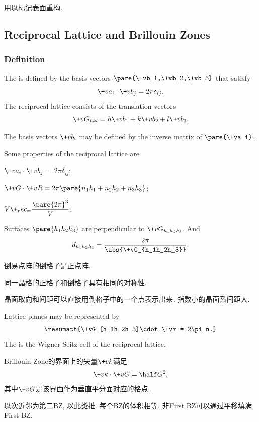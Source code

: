 \documentclass[hidelinks]{ctexart}
\begin{document}
用以标记表面重构.




\subsection{Reciprocal Lattice and Brillouin Zones} %
\label{sub:reciprocal_lattice_and_brillouin_zones}

\subsubsection{Definition} %
\label{ssub:definition}

The  is defined by the basis vectors $\pare{\+vb_1,\+vb_2,\+vb_3}$ that satisfy
\[ \+va_i \cdot \+vb_j = 2\pi \delta_{ij}. \]
The reciprocal lattice consists of the translation vectors
\[ \+vG_{hkl} = h\+vb_1 + k\+vb_2 + l\+vb_3. \]
\begin{remark}
    The basis vectors $\+vb_i$ may be defined by the inverse matrix of $\pare{\+va_i}$.
\end{remark}
Some properties of the reciprocal lattice are
\begin{cenum}
    \item $\+va_i \cdot \+vb_j$ = $2\pi \delta_{ij}$;
    \item $\+vG \cdot \+vR = 2\pi \pare{n_1h_1 + n_2h_2 + n_3 h_3}$;
    \item $\displaystyle V\+_rec_ = \frac{\pare{2\pi}^3}{V}$;
    \item Surfaces $\pare{h_1h_2h_3}$ are perpendicular to $\+vG_{h_1h_2h_3}$. And
    \[ d_{h_1h_2h_3} = \frac{2\pi}{\abs{\+vG_{h_1h_2h_3}}}. \]
    \item 倒易点阵的倒格子是正点阵.
    \item 同一晶格的正格子和倒格子具有相同的对称性.
\end{cenum}
晶面取向和间距可以直接用倒格子中的一个点表示出来. 指数小的晶面系间距大.
\par
Lattice planes may be represented by
\[ \resumath{\+vG_{h_1h_2h_3}\cdot \+vr = 2\pi n.} \]
The  is the Wigner-Seitz cell of the reciprocal lattice.\par
Brillouin Zone的界面上的矢量$\+vk$满足
\[ \+vk\cdot \+vG = \half G^2, \]
其中$\+vG$是该界面作为垂直平分面对应的格点.
\begin{remark}
    以次近邻为第二BZ, 以此类推. 每个BZ的体积相等. 非First BZ可以通过平移填满First BZ.
\end{remark}
\end{document}
